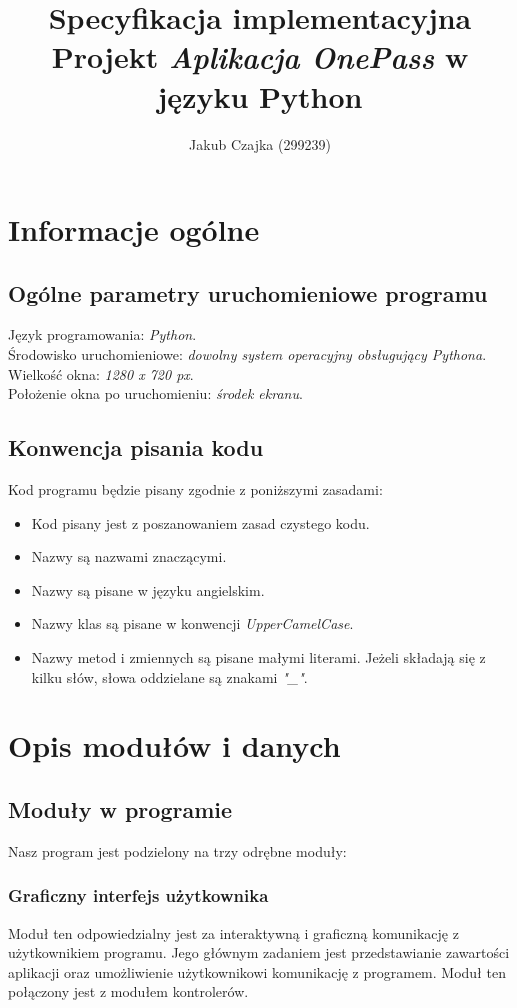 \documentclass[a4paper]{article}
\title{Specyfikacja implementacyjna \\ Projekt \textit{Aplikacja OnePass} w języku Python}
\author{Jakub Czajka (299239)}
\begin{document}
\maketitle
\thispagestyle{empty}
\tableofcontents

\newpage

\section{Informacje ogólne}
\subsection{Ogólne parametry uruchomieniowe programu}
Język programowania: \textit{Python}.\medskip\\
Środowisko uruchomieniowe: \textit{dowolny system operacyjny obsługujący Pythona}.\medskip\\
Wielkość okna: \textit{1280 x 720 px}.\medskip\\
Położenie okna po uruchomieniu: \textit{środek ekranu}.

\subsection{Konwencja pisania kodu}
Kod programu będzie pisany zgodnie z poniższymi zasadami:
\begin{itemize}
    \item Kod pisany jest z poszanowaniem zasad czystego kodu.
    \item Nazwy są nazwami znaczącymi.
    \item Nazwy są pisane w języku angielskim.
    \item Nazwy klas są pisane w konwencji \textit{UpperCamelCase}.
    \item Nazwy metod i zmiennych są pisane małymi literami. Jeżeli składają się z kilku słów, słowa oddzielane są znakami \textit{"\_"}.
\end{itemize}

\section{Opis modułów i danych}
\subsection{Moduły w programie}
Nasz program jest podzielony na trzy odrębne moduły:

\subsubsection{Graficzny interfejs użytkownika}
Moduł ten odpowiedzialny jest za interaktywną i graficzną komunikację z użytkownikiem programu. Jego głównym zadaniem jest przedstawianie zawartości aplikacji oraz umożliwienie użytkownikowi komunikację z programem. Moduł ten połączony jest z modułem kontrolerów.
\end{document}
